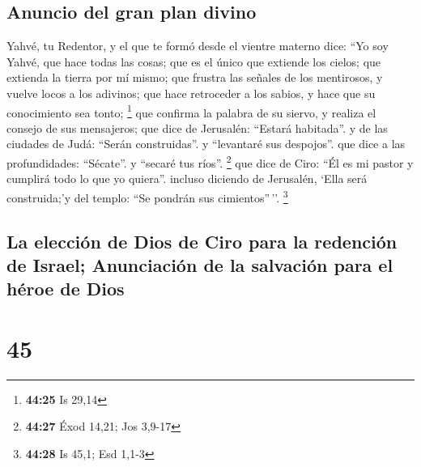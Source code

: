 \hypertarget{anuncio-del-gran-plan-divino}{%
\subsection{Anuncio del gran plan
divino}\label{anuncio-del-gran-plan-divino}}

 Yahvé, tu Redentor, y el que te formó desde el vientre
materno dice: ``Yo soy Yahvé, que hace todas las cosas; que es el único
que extiende los cielos; que extienda la tierra por mí mismo;
 que frustra las señales de los mentirosos, y vuelve
locos a los adivinos; que hace retroceder a los sabios, y hace que su
conocimiento sea tonto; \footnote{\textbf{44:25} Is 29,14}
 que confirma la palabra de su siervo, y realiza el
consejo de sus mensajeros; que dice de Jerusalén: ``Estará habitada''. y
de las ciudades de Judá: ``Serán construidas''. y ``levantaré sus
despojos''.  que dice a las profundidades: ``Sécate''. y
``secaré tus ríos''. \footnote{\textbf{44:27} Éxod 14,21; Jos 3,9-17}
 que dice de Ciro: ``Él es mi pastor y cumplirá todo lo
que yo quiera''. incluso diciendo de Jerusalén, `Ella será construida;'y
del templo: ``Se pondrán sus cimientos''\,''. \footnote{\textbf{44:28}
  Is 45,1; Esd 1,1-3}

\hypertarget{la-elecciuxf3n-de-dios-de-ciro-para-la-redenciuxf3n-de-israel-anunciaciuxf3n-de-la-salvaciuxf3n-para-el-huxe9roe-de-dios}{%
\subsection{La elección de Dios de Ciro para la redención de Israel;
Anunciación de la salvación para el héroe de
Dios}\label{la-elecciuxf3n-de-dios-de-ciro-para-la-redenciuxf3n-de-israel-anunciaciuxf3n-de-la-salvaciuxf3n-para-el-huxe9roe-de-dios}}

\hypertarget{section-44}{%
\section{45}\label{section-44}}

